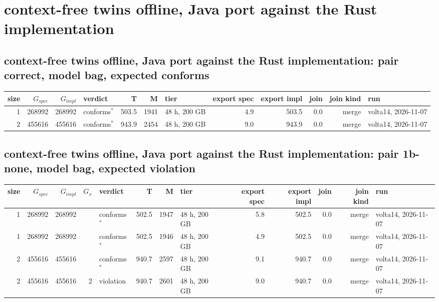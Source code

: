 \documentclass[10pt]{article}
\begin{document}
\section*{context-free twins offline, Java port against the Rust implementation}
\subsection*{context-free twins offline, Java port against the Rust implementation: pair \textsf{correct}, model bag, expected conforms}
\begin{longtable}{@{}rrrlrrlrrrrl@{}}
\toprule
size & $G_{\mathit{spec}}$ & $G_{\mathit{impl}}$ & verdict & T & M & tier & export spec & export impl & join & join kind & run \\
\midrule
\endhead
\color{red} 1 & 268992 & 268992 & conforms$^{\ast}$ & 503.5 & 1941 & 48 h, 200 GB & 4.9 & 503.5 & 0.0 & merge & volta14, 2026-11-07 \\
\color{red} 2 & 455616 & 455616 & conforms$^{\ast}$ & 943.9 & 2454 & 48 h, 200 GB & 9.0 & 943.9 & 0.0 & merge & volta14, 2026-11-07 \\
\bottomrule
\end{longtable}
\subsection*{context-free twins offline, Java port against the Rust implementation: pair \textsf{1b-none}, model bag, expected violation}
\begin{longtable}{@{}rrrrlrrlrrrrl@{}}
\toprule
size & $G_{\mathit{spec}}$ & $G_{\mathit{impl}}$ & $G_x$ & verdict & T & M & tier & export spec & export impl & join & join kind & run \\
\midrule
\endhead
\color{red} 1 & 268992 & 268992 &  & conforms$^{\ast}$ & 502.5 & 1947 & 48 h, 200 GB & 5.8 & 502.5 & 0.0 & merge & volta14, 2026-11-07 \\
\color{red} 1 & 268992 & 268992 &  & conforms$^{\ast}$ & 502.5 & 1946 & 48 h, 200 GB & 4.9 & 502.5 & 0.0 & merge & volta14, 2026-11-07 \\
\color{red} 2 & 455616 & 455616 &  & conforms$^{\ast}$ & 940.7 & 2597 & 48 h, 200 GB & 9.1 & 940.7 & 0.0 & merge & volta14, 2026-11-07 \\
\color{red} 2 & 455616 & 455616 & 2 & violation & 940.7 & 2601 & 48 h, 200 GB & 9.0 & 940.7 & 0.0 & merge & volta14, 2026-11-07 \\
\bottomrule
\end{longtable}
\end{document}
